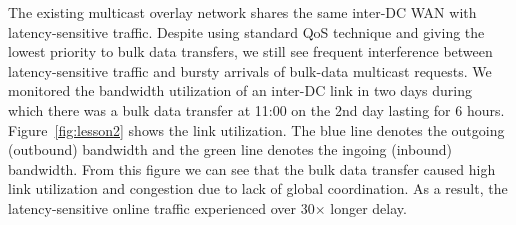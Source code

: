 



The existing multicast overlay network shares the same inter-DC WAN
with latency-sensitive traffic.
Despite using standard QoS technique and giving the lowest priority to
bulk data transfers, we still see frequent interference between
latency-sensitive traffic and bursty arrivals of bulk-data multicast
requests. We monitored the bandwidth utilization of an inter-DC
link in two days during which there was a bulk data transfer at 11:00 on the 2nd day lasting for 6 hours. Figure~\ref{fig:lesson2} shows the link utilization. The blue line denotes the outgoing (outbound) bandwidth and the green line denotes the ingoing (inbound) bandwidth.
From this figure we can see that the bulk data transfer caused high link utilization and congestion due
to lack of global coordination. As a result, the latency-sensitive online traffic experienced over
30$\times$ longer delay.

